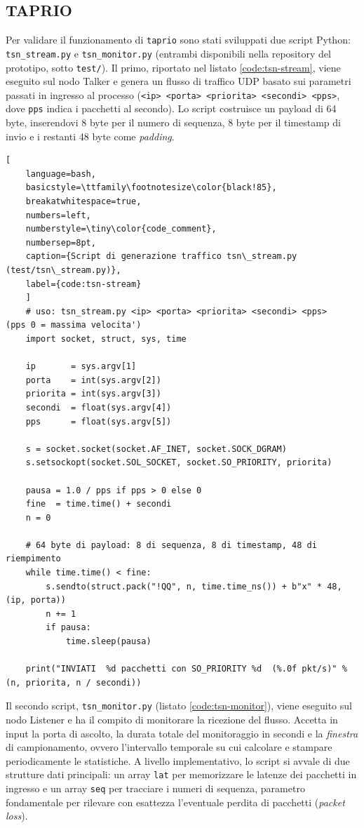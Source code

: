 \documentclass[12pt,a4paper,twoside]{book}
\begin{document}
\begin{onehalfspace}
\subsection{TAPRIO}
Per validare il funzionamento di \texttt{taprio} sono stati sviluppati due script Python: \texttt{tsn\_stream.py} e \texttt{tsn\_monitor.py} (entrambi disponibili nella repository del prototipo, sotto \texttt{test/}). Il primo, riportato nel listato \ref{code:tsn-stream}, viene eseguito sul nodo Talker e genera un flusso di traffico UDP basato sui parametri passati in ingresso al processo (\texttt{<ip> <porta> <priorita> <secondi> <pps>}, dove \texttt{pps} indica i pacchetti al secondo). Lo script costruisce un payload di 64 byte, inserendovi 8 byte per il numero di sequenza, 8 byte per il timestamp di invio e i restanti 48 byte come \textit{padding}.

\begin{lstlisting}[
    language=bash,
    basicstyle=\ttfamily\footnotesize\color{black!85},
    breakatwhitespace=true,
    numbers=left,
    numberstyle=\tiny\color{code_comment},
    numbersep=8pt,
    caption={Script di generazione traffico tsn\_stream.py (test/tsn\_stream.py)},
    label={code:tsn-stream}
    ]
    # uso: tsn_stream.py <ip> <porta> <priorita> <secondi> <pps>   (pps 0 = massima velocita')
    import socket, struct, sys, time

    ip       = sys.argv[1]
    porta    = int(sys.argv[2])
    priorita = int(sys.argv[3])
    secondi  = float(sys.argv[4])
    pps      = float(sys.argv[5])

    s = socket.socket(socket.AF_INET, socket.SOCK_DGRAM)
    s.setsockopt(socket.SOL_SOCKET, socket.SO_PRIORITY, priorita)

    pausa = 1.0 / pps if pps > 0 else 0
    fine  = time.time() + secondi
    n = 0

    # 64 byte di payload: 8 di sequenza, 8 di timestamp, 48 di riempimento
    while time.time() < fine:
        s.sendto(struct.pack("!QQ", n, time.time_ns()) + b"x" * 48, (ip, porta))
        n += 1
        if pausa:
            time.sleep(pausa)

    print("INVIATI  %d pacchetti con SO_PRIORITY %d  (%.0f pkt/s)" % (n, priorita, n / secondi))

\end{lstlisting}

Il secondo script, \texttt{tsn\_monitor.py} (listato \ref{code:tsn-monitor}), viene eseguito sul nodo Listener e ha il compito di monitorare la ricezione del flusso. Accetta in input la porta di ascolto, la durata totale del monitoraggio in secondi e la \textit{finestra} di campionamento, ovvero l'intervallo temporale su cui calcolare e stampare periodicamente le statistiche. A livello implementativo, lo script si avvale di due strutture dati principali: un array \texttt{lat} per memorizzare le latenze dei pacchetti in ingresso e un array \texttt{seq} per tracciare i numeri di sequenza, parametro fondamentale per rilevare con esattezza l'eventuale perdita di pacchetti (\textit{packet loss}).


\end{onehalfspace}
\end{document}
